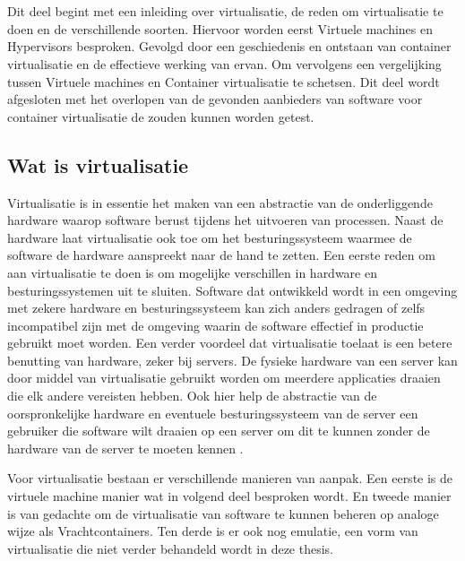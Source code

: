 \chapter{}
\label{ch:stand-van-zaken}
Dit deel begint met een inleiding over virtualisatie, de reden om virtualisatie te doen en de verschillende soorten. Hiervoor worden eerst Virtuele machines en Hypervisors besproken. Gevolgd door een geschiedenis en ontstaan van container virtualisatie en de  effectieve werking van ervan. Om vervolgens een vergelijking tussen Virtuele machines en Container virtualisatie te schetsen. Dit deel wordt afgesloten met het overlopen van de gevonden aanbieders van software voor container virtualisatie de zouden kunnen worden getest.


\section{Wat is virtualisatie}

Virtualisatie is in essentie het maken van een abstractie van de onderliggende hardware waarop  software berust tijdens het uitvoeren van processen. Naast de hardware laat virtualisatie ook toe om het besturingssysteem waarmee de software de hardware aanspreekt naar de hand te zetten. Een eerste reden om aan virtualisatie te doen is om mogelijke verschillen in hardware en besturingssystemen uit te sluiten.  Software dat ontwikkeld wordt in een omgeving met zekere hardware en besturingssysteem kan zich anders gedragen of zelfs incompatibel zijn met de omgeving waarin de software effectief in productie gebruikt  moet worden. Een verder voordeel dat virtualisatie toelaat is een betere benutting van hardware, zeker bij servers. De fysieke hardware van een server kan door middel van virtualisatie  gebruikt worden om meerdere applicaties draaien die elk andere vereisten hebben. Ook hier help de abstractie van de oorspronkelijke hardware en eventuele besturingssysteem van de server een gebruiker die software wilt draaien op een server om dit te kunnen zonder de hardware van de server te moeten kennen \Autocite{Yadav2018,Jangla2018}.

Voor virtualisatie bestaan er verschillende manieren van aanpak. Een eerste is de virtuele machine manier wat in volgend deel besproken wordt. En tweede manier is van gedachte om de virtualisatie van software te kunnen beheren  op analoge wijze als Vrachtcontainers. Ten derde is er ook nog emulatie, een vorm van virtualisatie die niet verder behandeld wordt in deze thesis.

